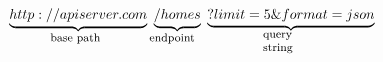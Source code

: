 \documentclass[11pt]{article}
\begin{document}
   \begin{equation*}
     \underbrace{http://apiserver.com}_{\parbox{4em}{\footnotesize base path}} \underbrace{/homes}_{\parbox{4em}{\footnotesize endpoint}} \underbrace{?limit=5\&format=json}_{\parbox{4em}{\footnotesize query string}}
   \end{equation*}
\end{document}
